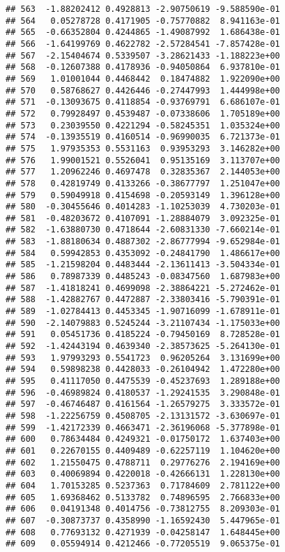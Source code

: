 \documentclass[
]{article}
\begin{document}
\begin{verbatim}
## 563  -1.88202412 0.4928813 -2.90750619 -9.588590e-01
## 564   0.05278728 0.4171905 -0.75770882  8.941163e-01
## 565  -0.66352804 0.4244865 -1.49087992  1.686438e-01
## 566  -1.64199769 0.4622782 -2.57284541 -7.857428e-01
## 567  -2.15404674 0.5339507 -3.28621433 -1.188223e+00
## 568  -0.12607388 0.4178936 -0.94050864  6.937810e-01
## 569   1.01001044 0.4468442  0.18474882  1.922090e+00
## 570   0.58768627 0.4426446 -0.27447993  1.444998e+00
## 571  -0.13093675 0.4118854 -0.93769791  6.686107e-01
## 572   0.79928497 0.4539487 -0.07338606  1.705189e+00
## 573   0.23039550 0.4221294 -0.58245351  1.035324e+00
## 574  -0.13935519 0.4160514 -0.96990035  6.721373e-01
## 575   1.97935353 0.5531163  0.93953293  3.146282e+00
## 576   1.99001521 0.5526041  0.95135169  3.113707e+00
## 577   1.20962246 0.4697478  0.32835367  2.144053e+00
## 578   0.42819749 0.4133266 -0.38677797  1.251047e+00
## 579   0.59049918 0.4154698 -0.20593149  1.396128e+00
## 580  -0.30455646 0.4014283 -1.10253039  4.730203e-01
## 581  -0.48203672 0.4107091 -1.28884079  3.092325e-01
## 582  -1.63880730 0.4718644 -2.60831330 -7.660214e-01
## 583  -1.88180634 0.4887302 -2.86777994 -9.652984e-01
## 584   0.59942853 0.4353092 -0.24841790  1.486617e+00
## 585  -1.21598204 0.4483444 -2.13611413 -3.504334e-01
## 586   0.78987339 0.4485243 -0.08347560  1.687983e+00
## 587  -1.41818241 0.4699098 -2.38864221 -5.272462e-01
## 588  -1.42882767 0.4472887 -2.33803416 -5.790391e-01
## 589  -1.02784413 0.4453345 -1.90716099 -1.678911e-01
## 590  -2.14079883 0.5245244 -3.21107434 -1.175033e+00
## 591   0.05451736 0.4185224 -0.79450169  8.728528e-01
## 592  -1.42443194 0.4639340 -2.38573625 -5.264130e-01
## 593   1.97993293 0.5541723  0.96205264  3.131699e+00
## 594   0.59898238 0.4428033 -0.26104942  1.472280e+00
## 595   0.41117050 0.4475539 -0.45237693  1.289188e+00
## 596  -0.46989824 0.4180537 -1.29241535  3.290848e-01
## 597  -0.46746487 0.4161564 -1.26579275  3.333572e-01
## 598  -1.22256759 0.4508705 -2.13131572 -3.630697e-01
## 599  -1.42172339 0.4663471 -2.36196068 -5.377898e-01
## 600   0.78634484 0.4249321 -0.01750172  1.637403e+00
## 601   0.22670155 0.4409489 -0.62257119  1.104620e+00
## 602   1.21550475 0.4788711  0.29776276  2.194169e+00
## 603   0.40069894 0.4220018 -0.42666131  1.228130e+00
## 604   1.70153285 0.5237363  0.71784609  2.781122e+00
## 605   1.69368462 0.5133782  0.74896595  2.766833e+00
## 606   0.04191348 0.4014756 -0.73812755  8.209303e-01
## 607  -0.30873737 0.4358990 -1.16592430  5.447965e-01
## 608   0.77693132 0.4271939 -0.04258147  1.648445e+00
## 609   0.05594914 0.4212466 -0.77205519  9.065375e-01

\end{verbatim}
\end{document}
